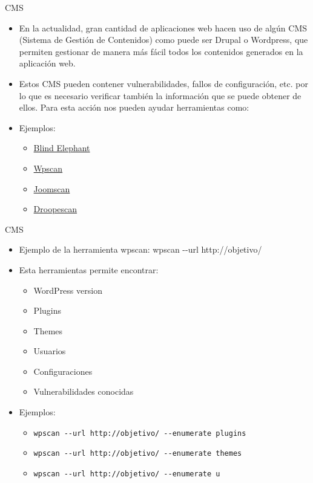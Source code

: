\documentclass[aspectratio=169,11pt]{beamer}
\newcommand{\cmd}[1]{\texttt{#1}}
\begin{document}
\begin{frame}[allowframebreaks]{CMS}
\small
  \begin{itemize}
  \item En la actualidad, gran cantidad de aplicaciones web hacen uso de algún CMS (Sistema de Gestión de Contenidos) como puede ser Drupal o Wordpress, que permiten gestionar de manera más fácil todos los contenidos generados en la aplicación web.
  \item Estos CMS pueden contener vulnerabilidades, fallos de configuración, etc. por lo que es necesario verificar también la información que se puede obtener de ellos. Para esta acción nos pueden ayudar herramientas como:
  \item Ejemplos:
    \begin{itemize}
  \item \href{https://blindelephant.sourceforge.net/}{Blind Elephant}
  \item \href{https://github.com/wpscanteam/wpscan}{Wpscan}
  \item \href{https://github.com/OWASP/joomscan}{Joomscan}
  \item \href{https://github.com/SamJoan/droopescan}{Droopescan}
  \end{itemize}
  \end{itemize}
\end{frame}

\begin{frame}[allowframebreaks]{CMS}
\small
  \begin{itemize}
  \item Ejemplo de la herramienta wpscan: wpscan -{}-url http://objetivo/
  \item Esta herramientas permite encontrar:
    \begin{itemize}
  \item WordPress version
 \item Plugins
 \item Themes
 \item Usuarios
 \item Configuraciones
 \item Vulnerabilidades conocidas
  \end{itemize}
\item Ejemplos:
\begin{itemize}
\item \cmd{wpscan -{}-url http://objetivo/ -{}-enumerate plugins}
\item \cmd{wpscan -{}-url http://objetivo/ -{}-enumerate themes}
\item \cmd{wpscan -{}-url http://objetivo/ -{}-enumerate u}
    \end{itemize}
    \end{itemize}

\end{frame}
\end{document}
